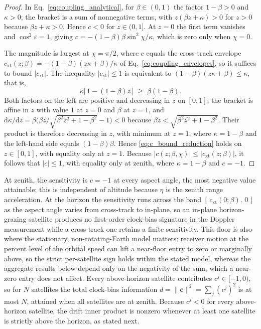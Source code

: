 \documentclass[letterpaper,times]{IONconf-v2}
\theoremstyle{plain}
\theoremstyle{remark}
\begin{document}
\begin{proof}
In Eq.~\eqref{eq:coupling_analytical}, for $\beta \in (0,1)$ the factor $1-\beta > 0$ and $\kappa > 0$; the bracket is a sum of nonnegative terms, with $z(\beta z+\kappa) > 0$ for $z > 0$ because $\beta z+\kappa > 0$. Hence $c < 0$ for $z \in (0,1]$. At $z = 0$ the first term vanishes and $\cos^2\varepsilon = 1$, giving $c = -(1-\beta)\beta\sin^2\chi/\kappa$, which is zero only when $\chi = 0$.

The magnitude is largest at $\chi = \pi/2$, where $c$ equals the cross-track envelope $c_{\mathrm{xt}}(z;\beta) = -(1-\beta)(z\kappa+\beta)/\kappa$ of Eq.~\eqref{eq:coupling_envelopes}, so it suffices to bound $|c_{\mathrm{xt}}|$. The inequality $|c_{\mathrm{xt}}| \le 1$ is equivalent to $(1-\beta)(z\kappa+\beta) \le \kappa$, that is,
%
\begin{equation}\label{eq:c_bound_reduction}
\kappa\bigl[\,1 - (1-\beta)z\,\bigr] \;\ge\; \beta(1-\beta) .
\end{equation}
%
Both factors on the left are positive and decreasing in $z$ on $[0,1]$: the bracket is affine in $z$ with value $1$ at $z = 0$ and $\beta$ at $z = 1$, and $\mathrm{d}\kappa/\mathrm{d}z = \beta\bigl(\beta z/\sqrt{\beta^2 z^2 + 1 - \beta^2} - 1\bigr) < 0$ because $\beta z < \sqrt{\beta^2 z^2 + 1 - \beta^2}$. Their product is therefore decreasing in $z$, with minimum at $z = 1$, where $\kappa = 1-\beta$ and the left-hand side equals $(1-\beta)\beta$. Hence \eqref{eq:c_bound_reduction} holds on $z \in [0,1]$, with equality only at $z = 1$. Because $|c(z;\beta,\chi)| \le |c_{\mathrm{xt}}(z;\beta)|$, it follows that $|c| \le 1$, with equality only at zenith, where $\kappa = 1-\beta$ and $c = -1$.
\end{proof}

At zenith, the sensitivity is $c = -1$ at every aspect angle, the most negative value attainable; this is independent of altitude because $\eta$ is the zenith range acceleration. At the horizon the sensitivity runs across the band $[\,c_{\mathrm{xt}}(0;\beta),\,0\,]$ as the aspect angle varies from cross-track to in-plane, so an in-plane horizon-grazing satellite produces no first-order clock-bias signature in the Doppler measurement while a cross-track one retains a finite sensitivity. This floor is also where the stationary, non-rotating-Earth model matters: receiver motion at the percent level of the orbital speed can lift a near-floor entry to zero or marginally above, so the strict per-satellite sign holds within the stated model, whereas the aggregate results below depend only on the negativity of the sum, which a near-zero entry does not affect. Every above-horizon satellite contributes $c^j \in [-1,0)$, so for $N$ satellites the total clock-bias information $d = \|\mathbf{c}\|^2 = \sum_j (c^j)^2$ is at most $N$, attained when all satellites are at zenith. Because $c^j < 0$ for every above-horizon satellite, the drift inner product is nonzero whenever at least one satellite is strictly above the horizon, as stated next.
\end{document}
